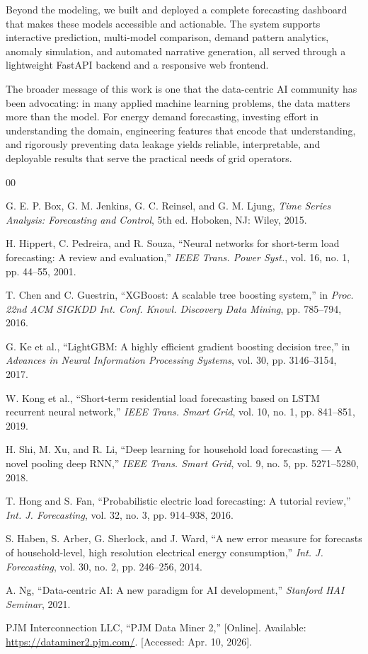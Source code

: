 \documentclass[conference]{IEEEtran}
\begin{document}
Beyond the modeling, we built and deployed a complete forecasting dashboard that makes these models accessible and actionable. The system supports interactive prediction, multi-model comparison, demand pattern analytics, anomaly simulation, and automated narrative generation, all served through a lightweight FastAPI backend and a responsive web frontend.

The broader message of this work is one that the data-centric AI community has been advocating: in many applied machine learning problems, the data matters more than the model. For energy demand forecasting, investing effort in understanding the domain, engineering features that encode that understanding, and rigorously preventing data leakage yields reliable, interpretable, and deployable results that serve the practical needs of grid operators.

\begin{thebibliography}{00}

 G. E. P. Box, G. M. Jenkins, G. C. Reinsel, and G. M. Ljung, \textit{Time Series Analysis: Forecasting and Control}, 5th ed. Hoboken, NJ: Wiley, 2015.

 H. Hippert, C. Pedreira, and R. Souza, ``Neural networks for short-term load forecasting: A review and evaluation,'' \textit{IEEE Trans. Power Syst.}, vol. 16, no. 1, pp. 44--55, 2001.

 T. Chen and C. Guestrin, ``XGBoost: A scalable tree boosting system,'' in \textit{Proc. 22nd ACM SIGKDD Int. Conf. Knowl. Discovery Data Mining}, pp. 785--794, 2016.

 G. Ke et al., ``LightGBM: A highly efficient gradient boosting decision tree,'' in \textit{Advances in Neural Information Processing Systems}, vol. 30, pp. 3146--3154, 2017.

 W. Kong et al., ``Short-term residential load forecasting based on LSTM recurrent neural network,'' \textit{IEEE Trans. Smart Grid}, vol. 10, no. 1, pp. 841--851, 2019.

 H. Shi, M. Xu, and R. Li, ``Deep learning for household load forecasting --- A novel pooling deep RNN,'' \textit{IEEE Trans. Smart Grid}, vol. 9, no. 5, pp. 5271--5280, 2018.

 T. Hong and S. Fan, ``Probabilistic electric load forecasting: A tutorial review,'' \textit{Int. J. Forecasting}, vol. 32, no. 3, pp. 914--938, 2016.

 S. Haben, S. Arber, G. Sherlock, and J. Ward, ``A new error measure for forecasts of household-level, high resolution electrical energy consumption,'' \textit{Int. J. Forecasting}, vol. 30, no. 2, pp. 246--256, 2014.

 A. Ng, ``Data-centric AI: A new paradigm for AI development,'' \textit{Stanford HAI Seminar}, 2021.

 PJM Interconnection LLC, ``PJM Data Miner 2,'' [Online]. Available: \url{https://dataminer2.pjm.com/}. [Accessed: Apr. 10, 2026].

\end{thebibliography}
\end{document}
